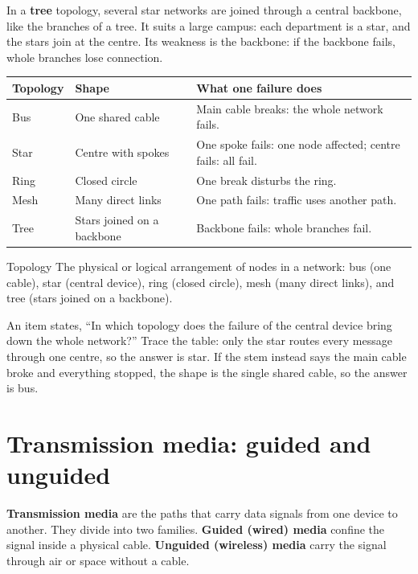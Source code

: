 In a \textbf{tree} topology, several star networks are joined through a
central backbone, like the branches of a tree. It suits a large campus: each
department is a star, and the stars join at the centre. Its weakness is the
backbone: if the backbone fails, whole branches lose connection.

\begin{center}
\begin{tabular}{p{}p{}p{}}
\toprule
\textbf{Topology} & \textbf{Shape} & \textbf{What one failure does} \\
\midrule
Bus & One shared cable & Main cable breaks: the whole network fails. \\
Star & Centre with spokes & One spoke fails: one node affected; centre fails: all fail. \\
Ring & Closed circle & One break disturbs the ring. \\
Mesh & Many direct links & One path fails: traffic uses another path. \\
Tree & Stars joined on a backbone & Backbone fails: whole branches fail. \\
\bottomrule
\end{tabular}
\end{center}

\begin{definitionbox}{Topology}
The physical or logical arrangement of nodes in a network: bus (one cable),
star (central device), ring (closed circle), mesh (many direct links), and
tree (stars joined on a backbone).
\end{definitionbox}

\begin{example}
An item states, ``In which topology does the failure of the central device
bring down the whole network?'' Trace the table: only the star routes every
message through one centre, so the answer is star. If the stem instead says
the main cable broke and everything stopped, the shape is the single shared
cable, so the answer is bus.
\end{example}

\section{Transmission media: guided and unguided}
\textbf{Transmission media} are the paths that carry data signals from one
device to another. They divide into two families. \textbf{Guided (wired)
media} confine the signal inside a physical cable. \textbf{Unguided
(wireless) media} carry the signal through air or space without a cable.

